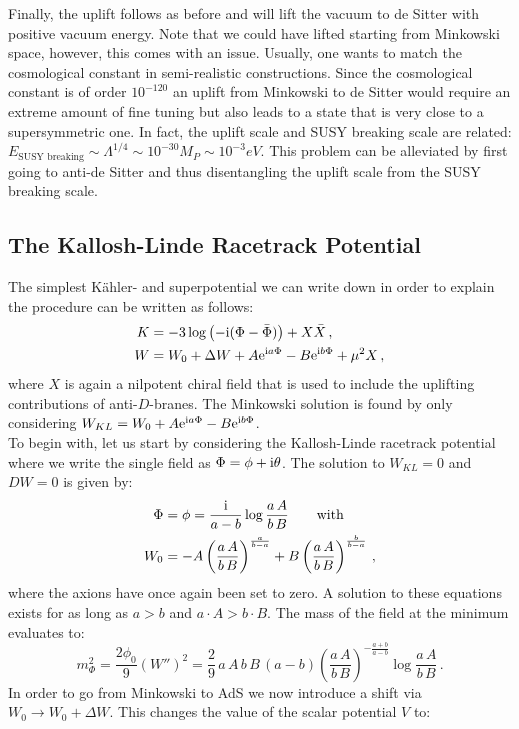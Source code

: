 \documentclass[a4paper,12pt,twoside,openright]{report}
\newcommand{\be}{\begin{equation}}
\newcommand{\ee}{\end{equation}}
\newcommand{\bea}{\begin{equation}\begin{aligned}}
\newcommand{\eea}{\end{aligned}\end{equation}}
\def\rmi{{\rm i}}
\def\rme{{\rm e}}
\begin{document}
Finally, the uplift follows as before and will lift the vacuum to de Sitter with positive vacuum energy. Note that we could have lifted starting from Minkowski space, however, this comes with an issue. Usually, one wants to match the cosmological constant in semi-realistic constructions. Since the cosmological constant is of order $10^{-120}$ an uplift from Minkowski to de Sitter would require an extreme amount of fine tuning but also leads to a state that is very close to a supersymmetric one. In fact, the uplift scale and SUSY breaking scale are related: $E_{\text{SUSY breaking}} \sim \Lambda^ {1/4} \sim 10^ {-30} M_P \sim 10^ {-3} eV$. This problem can be alleviated by first going to anti-de Sitter and thus disentangling the uplift scale from the SUSY breaking scale. 

\subsection{The Kallosh-Linde Racetrack Potential}
\label{sec:KLmodel}
The simplest Kähler- and superpotential we can write down in order to explain the procedure can be written as follows:
\bea 
K &=-3\log \left(-\rmi (\Phi - \bar{\Phi})\right) + X \bar{X}\,,\\
W &=W_0 + \Delta W +  A \rme^{\rmi a \Phi} - B \rme^{\rmi b \Phi} + \mu^2 X\,,
\label{eq:KLWandK}
\eea 
where $X$ is again a nilpotent chiral field that is used to include the uplifting contributions of anti-$D$-branes. The Minkowski solution is found by only considering $W_{KL} = W_0 +  A \rme^{\rmi a \Phi} - B \rme^{\rmi b \Phi}$.\\
To begin with, let us start by considering the Kallosh-Linde racetrack potential where we write the single field as $\Phi = \phi + \rmi \theta$. The solution to $W_{KL} = 0$ and $DW=0$ is given by:
\bea
\Phi &= \phi = \frac{\rmi}{a-b} \log \frac{a\, A}{b\, B} \qquad \text{with}\\
W_0 &= -A\left(\frac{a\, A}{b\, B}\right)^{\frac{a}{b-a}} + B\left(\frac{a\, A}{b\, B}\right)^{\frac{b}{b-a}}\,,
\eea
where the axions have once again been set to zero. A solution to these equations exists for as long as $a>b$ and $a\cdot A > b\cdot B$. The mass of the field at the minimum evaluates to:
\be 
m_\Phi^2 = \frac{2\phi_0}{9} \left( W'' \right)^2 = \frac{2}{9}\, a\,A\,b\,B\,(a-b) \left( \frac{a\,A}{b\,B}\right)^{-\frac{a+b}{a-b}} \log \frac{a\, A}{b\,B}\,.
\ee
In order to go from Minkowski to AdS we now introduce a shift via $W_0 \to W_0 + \Delta W$. This changes the value of the scalar potential $V$ to:
\end{document}
